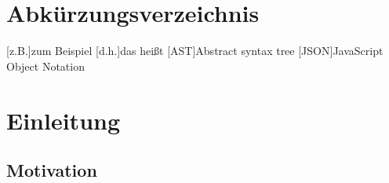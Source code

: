 \documentclass[oneside]{ausarbeitung}
\begin{document}
\chapter*{Abkürzungsverzeichnis}
\begin{acronym}[ANSI C / C89]  %

[z.B.]{zum Beispiel}
[d.h.]{das heißt}
[AST]{Abstract syntax tree}
[JSON]{JavaScript Object Notation}
\end{acronym}
\cleardoublepage
{}
\setcounter{page}{1}

\chapter{Einleitung}
\label{cha:einleitung}

\section{Motivation}
\label{sec:motivation}
\end{document}
